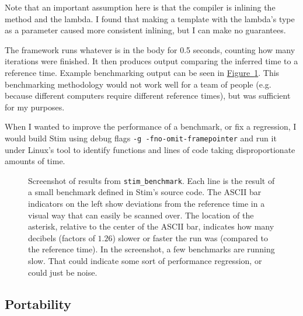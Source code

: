 \documentclass[onecolumn,unpublished]{quantumarticle}
\theoremstyle{definition}
\theoremstyle{definition}
\theoremstyle{definition}
\newcommand{\fig}[1]{\hyperref[fig:#1]{Figure~\ref*{fig:#1}}}
\begin{document}
Note that an important assumption here is that the compiler is inlining the  method and the lambda.
I found that making  a template with the lambda's type as a parameter caused more consistent inlining, but I can make no guarantees.

The framework runs whatever is in the  body for 0.5 seconds, counting how many iterations were finished.
It then produces output comparing the inferred time to a reference time.
Example benchmarking output can be seen in \fig{stim-benchmark-output}.
This benchmarking methodology would not work well for a team of people (e.g. because different computers require different reference times), but was sufficient for my purposes.

When I wanted to improve the performance of a benchmark, or fix a regression, I would build Stim using debug flags \texttt{-g -fno-omit-framepointer} and run it under Linux's  tool to identify functions and lines of code taking disproportionate amounts of time.

\begin{figure}
    \centering
    \caption{
        Screenshot of results from \texttt{stim\_benchmark}.
        Each line is the result of a small benchmark defined in Stim's source code.
        The ASCII bar indicators on the left show deviations from the reference time in a visual way that can easily be scanned over.
        The location of the asterisk, relative to the center of the ASCII bar, indicates how many decibels (factors of $1.26$) slower or faster the run was (compared to the reference time).
        In the screenshot, a few benchmarks are running slow.
        That could indicate some sort of performance regression, or could just be noise.
    }
    \label{fig:stim-benchmark-output}
\end{figure}


\subsection{Portability}
\end{document}
